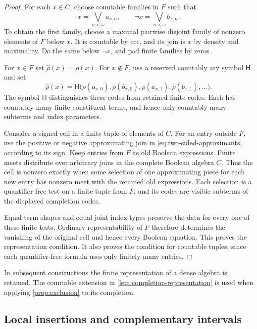 \documentclass[11pt]{article}
\theoremstyle{definition}
\theoremstyle{remark}
\begin{document}
\begin{proof}
For each $x\in C$, choose countable families in $F$ such that
\begin{equation}\label{eq:two-sided-approximants}
 x=\bigvee_{n<\omega}a_{x,n},\qquad
 \neg x=\bigvee_{n<\omega}b_{x,n}.
\end{equation}
To obtain the first family, choose a maximal pairwise disjoint family of
nonzero elements of $F$ below $x$.  It is countable by ccc, and its join
is $x$ by density and maximality.  Do the same below $\neg x$, and pad
finite families by zeros.

For $x\in F$ set $\widehat\rho(x)=\rho(x)$.  For $x\notin F$, use a
reserved countably ary symbol $\mathsf H$ and set
\[
 \widehat\rho(x)
 =\mathsf H\bigl(\rho(a_{x,0}),\rho(b_{x,0}),
                 \rho(a_{x,1}),\rho(b_{x,1}),\ldots\bigr).
\]
The symbol $\mathsf H$ distinguishes these codes from retained finite
codes.  Each has countably many finite constituent terms, and hence only
countably many subterms and index parameters.

Consider a signed cell in a finite tuple of elements of $C$.  For an
entry outside $F$, use the positive or negative approximating join in
\eqref{eq:two-sided-approximants}, according to its sign.  Keep entries
from $F$ as old Boolean expressions.  Finite meets distribute over
arbitrary joins in the complete Boolean algebra $C$.  Thus the cell is
nonzero exactly when some selection of one approximating piece for each
new entry has nonzero meet with the retained old expressions.  Each
selection is a quantifier-free test on a finite tuple from $F$, and its
codes are visible subterms of the displayed completion codes.

Equal term shapes and equal joint index types preserve the data for
every one of these finite tests.  Ordinary representability of $F$
therefore determines the vanishing of the original cell and hence every
Boolean equation.  This proves the representation condition.  It also
proves the condition for countable tuples, since each quantifier-free
formula uses only finitely many entries.
\end{proof}

In subsequent constructions the finite representation of a dense algebra
is retained.  The countable extension in
\cref{lem:completion-representation} is used when applying
\cref{prop:exclusion} to its completion.

\subsection{Local insertions and complementary intervals}\label{sec:surgery}
\end{document}
